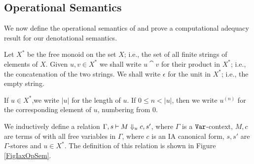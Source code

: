 \documentclass{article}
\begin{document}
\subsection{Operational Semantics}

We now define the operational semantics of \IAX and prove a computational adequacy result for our denotational semantics.

\begin{definition}
  Let $X^*$ be the free monoid on the set $X$; i.e., the set of all finite strings of elements of $X$.
  Given $u,v\in X^*$ we shall write $u\cat v$ for their product in $X^*$; i.e., the concatenation of the two strings.
  We shall write $\epsilon$ for the unit in $X^*$; i.e., the empty string.

  If $u\in X^*$,we write $|u|$ for the length of $u$.
  If $0\le n < |u|$, then we write $u^{(n)}$ for the corresponding element of $u$, numbering from $0$.

  We inductively define a relation $\Gamma,s\mathbin{\vdash} M\Downarrow_u c,s'$, where $\Gamma$ is a ${\mathtt{Var}}$-context, $M,c$ are terms of \IAX with all free variables in $\Gamma$, where $c$ is an IA canonical form, $s,s'$ are $\Gamma$-stores and $u\in X^*$.
  The definition of this relation is shown in Figure \ref{FigIaxOpSem}.


\end{definition}
\end{document}
